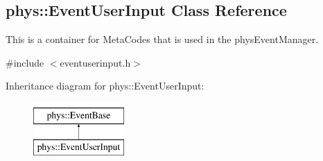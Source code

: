 \hypertarget{classphys_1_1EventUserInput}{
\subsection{phys::EventUserInput Class Reference}
\label{classphys_1_1EventUserInput}
}


This is a container for MetaCodes that is used in the physEventManager.  




{\ttfamily \#include $<$eventuserinput.h$>$}

Inheritance diagram for phys::EventUserInput:\begin{figure}[H]
\begin{center}
\leavevmode
\includegraphics[height=2.000000cm]{classphys_1_1EventUserInput}
\end{center}
\end{figure}
